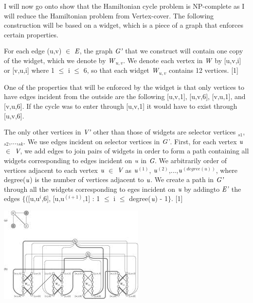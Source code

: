 \documentclass[a4paper]{report}
\begin{document}
\vspace{3mm}
I will now go onto show that the Hamiltonian cycle problem is NP-complete as I will reduce the Hamiltonian problem from Vertex-cover. The following construction will be based on a widget, which is a piece of a graph that enforces certain properties.

\vspace{3mm}
For each edge (u,v) $\in$ $\emph{E}$, the graph $\emph{G'}$ that we construct will contain one copy of the widget, which we denote by $\emph{W}$$_{u,v}$. We denote each vertex in $\emph{W}$ by [u,v,i] or [v,u,i] where 1 $\leq$ i $\leq$ 6, so that each widget $\emph{W}$$_{u,v}$ contains 12 vertices. [1]

\vspace{3mm}

One of the properties that will be enforced by the widget is that only vertices to have edges incident from the outside are the following [u,v,1], [u,v,6], [v,u,1], and [v,u,6]. If the cycle was to enter through [u,v,1] it would have to exist through [u,v,6].

\vspace{3mm}
The only other vertices in $\emph{V'}$ other than those of widgets are selector vertices $_{s1}$,$_{s2}$,...,$_{sk}$. We use edges incident on selector vertices in $\emph{G'}$. First, for each vertex $\emph{u}$ $\in$ $\emph{V}$, we add edges to join pairs of widgets in order to form a path containing all widgets corresponding to edges incident on $\emph{u}$ in $\emph{G}$. We arbitrarily order of vertices adjacent to each vertex $\emph{u}$ $\in$ $\emph{V}$ as $\emph{u}$$^{(1)}$, $\emph{u}$$^{(2)}$,...,$\emph{u}$$^{(degree(u))}$, where degree($\emph{u}$) is the number of vertices adjacent to $\emph{u}$. We create a path in $\emph{G'}$ through all the widgets corresponding to eges incident on $\emph{u}$ by addingto $\emph{E'}$ the edges $\lbrace$([u,u$^{i}$,6], [u,u$^{(i+1)}$,1] : 1 $\leq$ i $\leq$ degree($\emph{u}$) - 1$\rbrace$. [1]

\begin{center}
\includegraphics[scale=0.85]{download.png}
\end{center}
\end{document}

